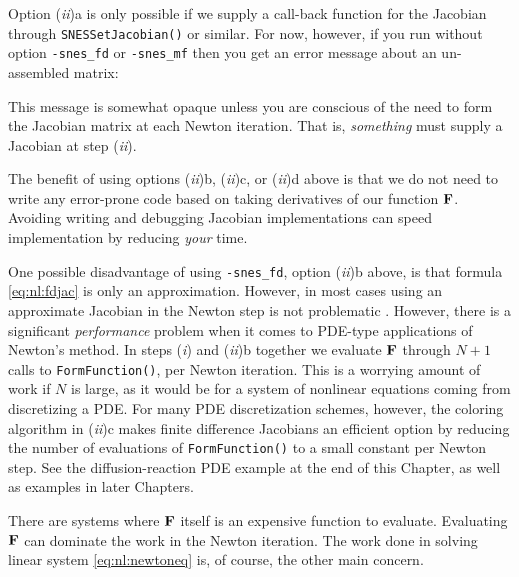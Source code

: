Option (\emph{ii})a is only possible if we supply a call-back function for the Jacobian through \texttt{SNESSetJacobian()} or similar.  For now, however, if you run without option \texttt{-snes\_fd} or \texttt{-snes\_mf} then you get an error message about an un-assembled matrix:
This message is somewhat opaque unless you are conscious of the need to form the Jacobian matrix at each Newton iteration.  That is, \emph{something} must supply a Jacobian at step (\emph{ii}).

The benefit of using options (\emph{ii})b, (\emph{ii})c, or (\emph{ii})d above is that we do not need to write any error-prone code based on taking derivatives of our function $\mathbf{F}$.  Avoiding writing and debugging Jacobian implementations can speed implementation by reducing \emph{your} time.

One possible disadvantage of using  \texttt{-snes\_fd}, option (\emph{ii})b above, is that formula \eqref{eq:nl:fdjac} is only an approximation.  However, in most cases using an approximate Jacobian in the Newton step is not problematic \citep{Kelley2003}.  However, there is a significant \emph{performance} problem when it comes to PDE-type applications of Newton's method.  In steps (\emph{i}) and (\emph{ii})b together we evaluate $\mathbf{F}$ through $N+1$ calls to \texttt{FormFunction()}, per Newton iteration.  This is a worrying amount of work if $N$ is large, as it would be for a system of nonlinear equations coming from discretizing a PDE.  For many PDE discretization schemes, however, the coloring algorithm in (\emph{ii})c makes finite difference Jacobians an efficient option by reducing the number of evaluations of \texttt{FormFunction()} to a small constant per Newton step.  See the diffusion-reaction PDE example at the end of this Chapter, as well as examples in later Chapters.

There are systems where $\mathbf{F}$ itself is an expensive function to evaluate.  Evaluating $\mathbf{F}$ can dominate the work in the Newton iteration.  The work done in solving linear system \eqref{eq:nl:newtoneq} is, of course, the other main concern.


